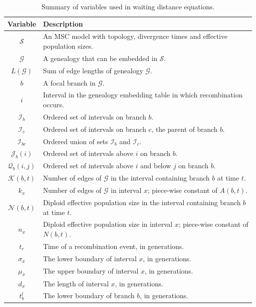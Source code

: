 \documentclass[11pt]{article}
\begin{document}
\begin{table}[p]
\centering
\caption{\label{tab:table-notation} 
	Summary of variables used in waiting distance equations. 
}
\begin{tabular}[t]{ |c|l| }
	\toprule
	Variable & Description \\
	\midrule
	$\mathcal{S}$    & An MSC model with topology, divergence times and effective population sizes. \\
	$\mathcal{G}$    & A genealogy that can be embedded in $\mathcal{S}$. \\
	$L(\mathcal{G})$ & Sum of edge lengths of genealogy $\mathcal{G}$. \\
	$b$ 			  & A focal branch in $\mathcal{G}$. \\
	$i$              & Interval in the genealogy embedding table in which recombination occurs.\\
	$\mathcal{I}_b$  & Ordered set of intervals on branch $b$.\\
	$\mathcal{I}_{c}$   & Ordered set of intervals on branch $c$, the parent of branch $b$.\\
	$\mathcal{I}_{bc}$  & Ordered union of sets $\mathcal{I}_{b}$ and $\mathcal{I}_{c}$.\\
	$\mathcal{J}_b(i)$  & Ordered set of intervals above $i$ on branch $b$.\\	
	$\mathcal{Q}_b(i,j)$ & Ordered set of intervals above $i$ and below $j$ on branch $b$.\\
	$\mathcal{K}(b,t)$ & Number of edges of $\mathcal{G}$ in the interval containing branch $b$ at time $t$.\\
	$k_x$              & Number of edges of $\mathcal{G}$ in interval $x$; piece-wise constant of $A(b,t)$.\\
	$\mathcal{N}(b,t)$ & Diploid effective population size in the interval containing branch $b$ at time $t$.\\
	$n_x$              & Diploid effective population size in interval $x$; piece-wise constant of $N(b,t)$. \\
	$t_r$		& Time of a recombination event, in generations. \\
	$\sigma_x$     & The lower boundary of interval $x$, in generations. \\
	$\mu_x$        & The upper boundary of interval $x$, in generations. \\	
	$d_x$          & The length of interval $x$, in generations. \\
	$t_b^l$        & The lower boundary of branch $b$, in generations. \\

\end{tabular}
\end{table}
\end{document}
